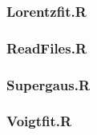 \subsubsection*{Lorentzfit.R}\label{lorentzfit}


\subsubsection*{ReadFiles.R}\label{Read}


\subsubsection*{Supergaus.R}\label{supergaus}


\subsubsection*{Voigtfit.R}\label{voigtfit}


